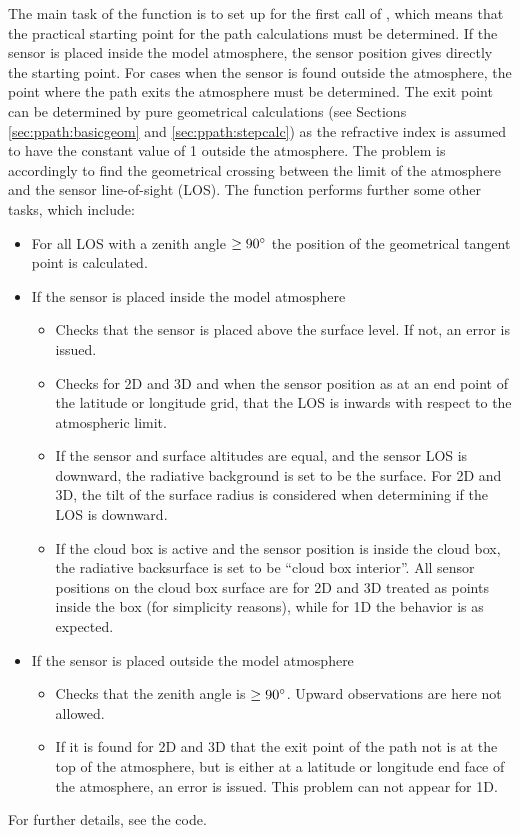 The main task of the function  is to
set up  for the first call of
, which means that the practical
starting point for the path calculations must be determined. If the
sensor is placed inside the model atmosphere, the sensor position
gives directly the starting point. For cases when the sensor is found
outside the atmosphere, the point where the path exits the atmosphere
must be determined. The exit point can be determined by pure
geometrical calculations (see Sections \ref{sec:ppath:basicgeom} and
\ref{sec:ppath:stepcalc}) as the refractive index is assumed to have the
constant value of 1 outside the atmosphere. The problem is accordingly
to find the geometrical crossing between the limit of the atmosphere
and the sensor line-of-sight (LOS). The function performs further some
other tasks, which include:
\begin{itemize}
\item For all LOS with a zenith angle $\geq 90^\circ$ the position of
  the geometrical tangent point is calculated.
\item If the sensor is placed inside the model atmosphere
  \begin{itemize}
  \item Checks that the sensor is placed above the surface level. If
    not, an error is issued.
  \item Checks for 2D and 3D and when the sensor position as at an end
    point of the latitude or longitude grid, that the LOS is inwards
    with respect to the atmospheric limit.
  \item If the sensor and surface altitudes are equal, and the sensor
    LOS is downward, the radiative background is set to be the
    surface. For 2D and 3D, the tilt of the surface radius is considered
    when determining if the LOS is downward.
  \item If the cloud box is active and the sensor position is inside
    the cloud box, the radiative backsurface is set to be ``cloud box
    interior''. All sensor positions on the cloud box surface are for
    2D and 3D treated as points inside the box (for simplicity
    reasons), while for 1D the behavior is as expected.
  \end{itemize}
\item If the sensor is placed outside the model atmosphere
  \begin{itemize}
  \item Checks that the zenith angle is $\geq  90^\circ$.  Upward
    observations are here not allowed.
  \item If it is found for 2D and 3D that the exit point of the path
    not is at the top of the atmosphere, but is either at a latitude
    or longitude end face of the atmosphere, an error is issued. This
    problem can not appear for 1D.
  \end{itemize}
\end{itemize}
For further details, see the code.


